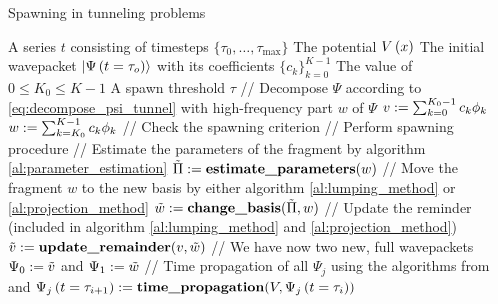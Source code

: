 \begin{chapter}{Spawning in tunneling problems}
\begin{algorithm}
\caption{Spawning propagation method (simplified)}
\label{al:spawning_propagation}
\begin{algorithmic}
  \REQUIRE A series $t$ consisting of timesteps $\{\tau_0, \ldots, \tau_{\text{max}}\}$
  \REQUIRE The potential $V\left( x \right)$
  \REQUIRE The initial wavepacket $\Ket{\Psi\left( t=\tau_o \right)}$ with its coefficients $\{c_k\}_{k=0}^{K-1}$
  \REQUIRE The value of $0 \leq K_0 \leq K-1$
  \REQUIRE A spawn threshold $\tau$
    \STATE // Decompose $\Psi$ according to \eqref{eq:decompose_psi_tunnel} with high-frequency part $w$ of $\Psi$
    \STATE $v := \sum_{k=0}^{K_0-1} c_k \phi_k$
    \STATE $w := \sum_{k=K_0}^{K-1} c_k \phi_k$
    \STATE // Check the spawning criterion
      \STATE // Perform spawning procedure
      \STATE // Estimate the parameters of the fragment by algorithm \ref{al:parameter_estimation}
      \STATE $\tilde{\Pi} := \textbf{estimate\_parameters}(w)$
      \STATE // Move the fragment $w$ to the new basis by either algorithm \ref{al:lumping_method} or \ref{al:projection_method}
      \STATE $\tilde{w} := \textbf{change\_basis}(\tilde{\Pi}, w)$
      \STATE // Update the reminder (included in algorithm \ref{al:lumping_method} and \ref{al:projection_method})
      \STATE $\tilde{v} := \textbf{update\_remainder}(v, \tilde{w})$
      \STATE // We have now two new, full wavepackets
      \STATE $\Psi_0 := \tilde{v}$ and $\Psi_1 := \tilde{w}$
    \ENDIF
    \STATE // Time propagation of all $\Psi_j$ using the algorithms from \cite{FGL_semiclassical_dynamics} and \cite{BGH_natac}
       \STATE $\Psi_j\left( t=\tau_{i+1} \right) := \textbf{time\_propagation}(V, \Psi_j\left( t=\tau_i \right))$
    \ENDFOR
  \ENDFOR
\end{algorithmic}
\end{algorithm}



\end{chapter}

